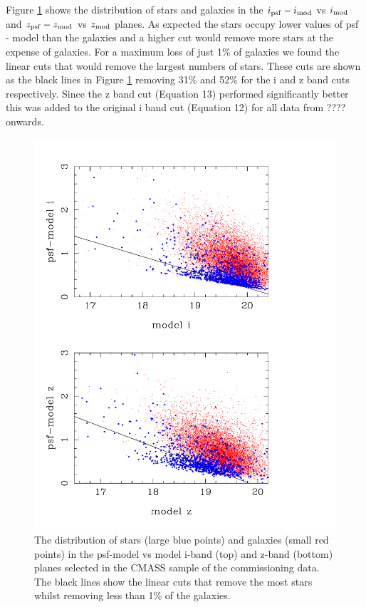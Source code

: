 \documentclass[preprint]{aastex}
\newcommand{\imod}{i_{\rm mod}}
\newcommand{\ipsf}{i_{\rm psf}}
\newcommand{\zpsf}{z_{\rm psf}}
\newcommand{\zmod}{z_{\rm mod}}
\begin{document}
Figure \ref{fig:stargal} shows the distribution of stars and galaxies in the
$\ipsf-\imod$ vs $\imod$ and $\zpsf-\zmod$ vs $\zmod$ planes. As expected the
stars occupy lower values of psf - model than the galaxies and a higher cut
would remove more stars at the expense of galaxies. For a maximum loss of just
1\% of galaxies we found the linear cuts that would remove the largest numbers
of stars. These cuts are shown as the black lines in Figure \ref{fig:stargal}
removing 31\% and 52\% for the i and z band cuts respectively. Since the z band
cut (Equation 13) performed significantly better this was added to the original
i band cut (Equation 12) for all data from ???? onwards.

\begin{figure}
\includegraphics[width=0.95\columnwidth]{plots/star_gal_chunk2_paper}
\caption{The distribution of stars (large blue points) and galaxies (small red
points) in the psf-model vs model i-band (top) and z-band (bottom) planes
selected in the CMASS sample of the commissioning data. The black lines show the
linear cuts that remove the most stars whilst removing less than 1\% of the
galaxies.}
\label{fig:stargal}
\end{figure}
\end{document}
